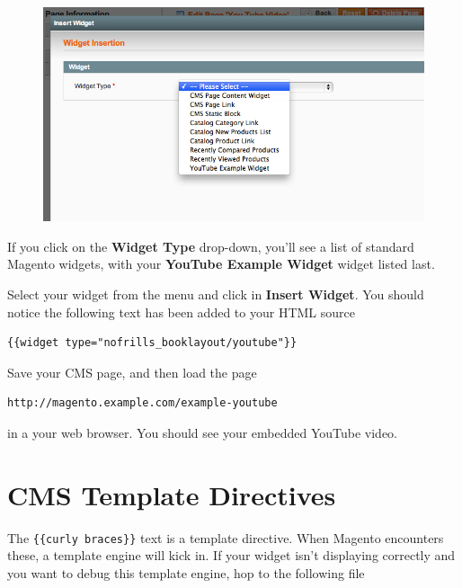 \documentclass[oneside]{book}
\begin{document}
\begin{figure}[htb]
\begin{center}
\leavevmode
\includegraphics[width=1\textwidth]{images/chapter7/widget-window.png}
\end{center}
\caption{}
\end{figure}


If you click on the \textbf{Widget Type} drop-down, you'll see a list of standard Magento widgets, with your \textbf{YouTube Example Widget} widget listed last.

Select your widget from the menu and click in \textbf{Insert Widget}.  You should notice the following text has been added to your HTML source

\begin{lstlisting}
{{widget type="nofrills_booklayout/youtube"}}

\end{lstlisting}


Save your CMS page, and then load the page 

\begin{lstlisting}
http://magento.example.com/example-youtube

\end{lstlisting}


in a your web browser.   You should see your embedded YouTube video. 

\section{CMS Template Directives}

The \footnotesize\texttt{\{\{curly braces\}\}} \normalsize  text is a template directive.  When Magento encounters these, a template engine will kick in.  If your widget isn't displaying correctly and you want to debug this template engine, hop to the following file
\end{document}
